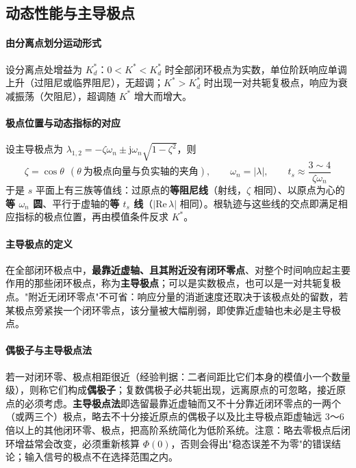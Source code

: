 \subsection{动态性能与主导极点}
\paragraph{由分离点划分运动形式}设分离点处增益为 $K^*_d$：$0<K^*<K^*_d$ 时全部闭环极点为实数，单位阶跃响应单调上升（过阻尼或临界阻尼），无超调；$K^*>K^*_d$ 时出现一对共轭复极点，响应为衰减振荡（欠阻尼），超调随 $K^*$ 增大而增大。

\paragraph{极点位置与动态指标的对应}设主导极点为 $\lambda_{1,2}=-\zeta\omega_n\pm\mathrm{j}\omega_n\sqrt{1-\zeta^2}$，则
\[
\zeta=\cos\theta\ \ (\theta\ \text{为极点向量与负实轴的夹角}),\qquad
\omega_n=|\lambda|,\qquad
t_s\approx\frac{3\sim4}{\zeta\omega_n}
\]
于是 $s$ 平面上有三族等值线：过原点的\textbf{等阻尼线}（射线，$\zeta$ 相同）、以原点为心的\textbf{等 $\omega_n$ 圆}、平行于虚轴的\textbf{等 $t_s$ 线}（$|\mathrm{Re}\,\lambda|$ 相同）。根轨迹与这些线的交点即满足相应指标的极点位置，再由模值条件反求 $K^*$。

\paragraph{主导极点的定义}在全部闭环极点中，\textbf{最靠近虚轴、且其附近没有闭环零点}、对整个时间响应起主要作用的那些闭环极点，称为\textbf{主导极点}；可以是实数极点，也可以是一对共轭复极点。"附近无闭环零点"不可省：响应分量的消逝速度还取决于该极点处的留数，若某极点旁紧挨一个闭环零点，该分量被大幅削弱，即使靠近虚轴也未必是主导极点。

\paragraph{偶极子与主导极点法}若一对闭环零、极点相距很近（经验判据：二者间距比它们本身的模值小一个数量级），则称它们构成\textbf{偶极子}；复数偶极子必共轭出现，远离原点的可忽略，接近原点的必须考虑。\textbf{主导极点法}即选留最靠近虚轴而又不十分靠近闭环零点的一两个（或两三个）极点，略去不十分接近原点的偶极子以及比主导极点距虚轴远 3～6 倍以上的其他闭环零、极点，把高阶系统简化为低阶系统。注意：略去零极点后闭环增益常会改变，必须重新核算 $\Phi(0)$，否则会得出"稳态误差不为零"的错误结论；输入信号的极点不在选择范围之内。

